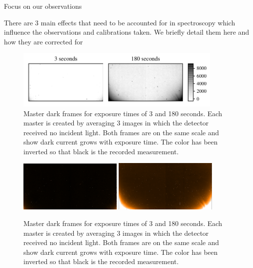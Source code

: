 Focus on our observations

There are 3 main effects that need to be accounted for in {\nir} spectroscopy which influence the observations and calibrations taken. We briefly detail them here and how they are corrected for

\begin{figure}[h]
\centering
\includegraphics[width=0.9\textwidth]{figures/reduction/master_darks_1.pdf}
\caption{Master dark frames for exposure times of  3 and 180 seconds. Each master is created by averaging 3 images in which the detector received no incident light. Both frames are on the same scale and show dark current grows with exposure time. The color has been inverted so that black is the recorded measurement.}
\label{fig:darkcurrent}
\end{figure}
\begin{figure}[h]
    \centering
    \includegraphics[width=0.45\textwidth]{figures/reduction/MasterDarkFlat_1.png}
    \includegraphics[width=0.45\textwidth]{figures/reduction/MasterDarkSpec_1.png}
    \caption{Master dark frames for exposure times of  3 and 180 seconds. Each master is created by averaging 3 images in which the detector received no incident light. Both frames are on the same scale and show dark current grows with exposure time. The color has been inverted so that black is the recorded measurement.}
    \label{fig:darkcurrent_color}
\end{figure}

